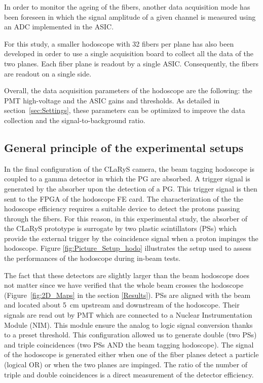 \documentclass[a4paper,11pt]{article}
\begin{document}
In order to monitor the ageing of the fibers, another data acquisition mode has been foreseen in which the signal amplitude of a given channel is measured using an ADC implemented in the ASIC.

For this study, a smaller hodoscope with 32 fibers per plane has also been developed in order to use a single acquisition board to collect all the data of the two planes. Each fiber plane is readout by a single ASIC. Consequently, the fibers are readout on a single side.

Overall, the data acquisition parameters of the hodoscope are the following: the PMT high-voltage and the ASIC gains and thresholds. As detailed in section~\ref{sec:Settings}, these parameters can be optimized to improve the data collection and the signal-to-background ratio.


\subsection{General principle of the experimental setups}
\label{GeneralPrinc}

In the final configuration of the CLaRyS camera, the beam tagging hodoscope is coupled to a gamma detector in which the PG are absorbed. A trigger signal is generated by the absorber upon the detection of a PG. This trigger signal is then sent to the FPGA of the hodoscope FE card. The characterization of the the hodoscope efficiency requires a suitable device to detect the protons passing through the fibers. For this reason, in this experimental study, the absorber of the CLaRyS prototype is surrogate by two plastic scintillators (PSs) which provide the external trigger by the coincidence signal when a proton impinges the hodoscope. Figure \ref{fig:Picture_Setup_hodo} illustrates the setup used to assess the performances of the hodoscope during in-beam tests. 

The fact that these detectors are slightly larger than the beam hodoscope does not matter since we have verified that the whole beam crosses the hodoscope (Figure~\ref{fig:2D_Maps} in the section \ref{Results}). PSs are aligned with the beam and located about 5~cm upstream and downstream of the hodoscope. Their signals are read out by PMT which are connected to a Nuclear Instrumentation Module (NIM). This module ensure the analog to logic signal conversion thanks to a preset threshold. This configuration allowed us to generate double (two PSs) and triple coincidences (two PSs AND the beam tagging hodoscope). The signal of the hodoscope is generated either when one of the fiber planes detect a particle (logical OR) or when the two planes are impinged. The ratio of the number of triple and double coincidences is a direct measurement of the detector efficiency.
\end{document}
